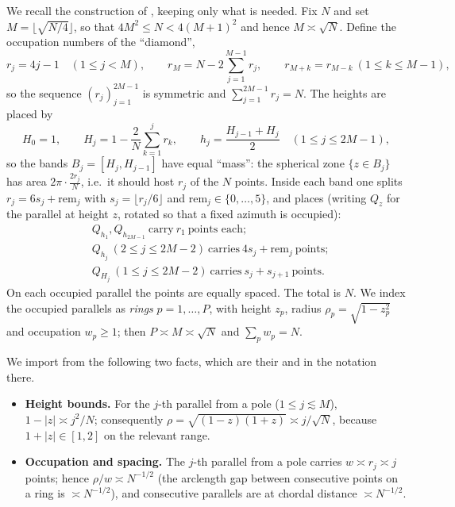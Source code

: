 \documentclass[11pt,reqno]{amsart}
\theoremstyle{definition}
\newcommand{\abs}[1]{\lvert #1\rvert}
\newcommand{\rp}{\rho}
\begin{document}
We recall the construction of \cite[\S4]{BEMOC}, keeping only what is needed. Fix $N$ and set
$M=\lfloor\sqrt{N/4}\rfloor$, so that $4M^2\le N< 4(M+1)^2$ and hence $M\asymp\sqrt N$. Define the
occupation numbers of the ``diamond'',
\[
   r_j=4j-1\quad(1\le j< M),\qquad r_M=N-2\sum_{j=1}^{M-1}r_j,\qquad r_{M+k}=r_{M-k}\ (1\le k\le M-1),
\]
so the sequence $(r_j)_{j=1}^{2M-1}$ is symmetric and $\sum_{j=1}^{2M-1}r_j=N$. The heights are
placed by
\[
   H_0=1,\qquad H_j=1-\frac{2}{N}\sum_{k=1}^{j}r_k,\qquad h_j=\frac{H_{j-1}+H_j}{2}\quad(1\le j\le 2M-1),
\]
so the bands $B_j=[H_j,H_{j-1}]$ have equal ``mass'': the spherical zone $\{z\in B_j\}$ has area
$2\pi\cdot\frac{2r_j}{N}$, i.e.\ it should host $r_j$ of the $N$ points. Inside each band one splits
$r_j=6s_j+\mathrm{rem}_j$ with $s_j=\lfloor r_j/6\rfloor$ and $\mathrm{rem}_j\in\{0,\dots,5\}$, and
places (writing $Q_z$ for the parallel at height $z$, rotated so that a fixed azimuth is occupied):
\[
\begin{aligned}
&Q_{h_1},Q_{h_{2M-1}}\ \text{carry}\ r_1\ \text{points each};\\
&Q_{h_j}\ (2\le j\le 2M-2)\ \text{carries}\ 4s_j+\mathrm{rem}_j\ \text{points};\\
&Q_{H_j}\ (1\le j\le 2M-2)\ \text{carries}\ s_j+s_{j+1}\ \text{points}.
\end{aligned}
\]
On each occupied parallel the points are equally spaced. The total is $N$. We index the occupied
parallels as \emph{rings} $p=1,\dots,P$, with height $z_p$, radius $\rp_p=\sqrt{1-z_p^2}$ and
occupation $w_p\ge1$; then $P\asymp M\asymp\sqrt N$ and $\sum_p w_p=N$.

We import from \cite{BEMOC} the following two facts, which are their
\cite[Lemma~facil2 / eq.~(zjbound)]{BEMOC} and \cite[Lemma~erres]{BEMOC} in the notation there.

\begin{itemize}[leftmargin=1.6em,itemsep=3pt]
\item[(P1)] \textbf{Height bounds.} For the $j$-th parallel from a pole ($1\le j\lesssim M$),
      $1-\abs{z}\asymp j^2/N$; consequently $\rp=\sqrt{(1-z)(1+z)}\asymp j/\sqrt N$, because
      $1+\abs{z}\in[1,2]$ on the relevant range.
\item[(P2)] \textbf{Occupation and spacing.} The $j$-th parallel from a pole carries
      $w\asymp r_j\asymp j$ points; hence $\rp/w\asymp N^{-1/2}$ (the arclength gap between
      consecutive points on a ring is $\asymp N^{-1/2}$), and consecutive parallels are at chordal
      distance $\asymp N^{-1/2}$.
\end{itemize}
\end{document}
